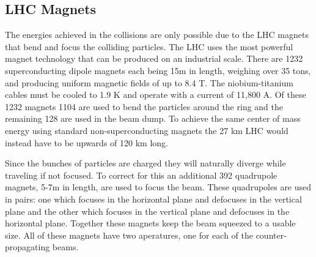 \subsection{LHC Magnets}
The energies achieved in the collisions are only possible due to the LHC magnets that bend and focus the colliding particles.  The LHC uses the most powerful magnet technology that can be produced on an industrial scale.  There are 1232 superconducting dipole magnets each being 15m in length, weighing over 35 tons, and producing uniform magnetic fields of up to 8.4 T.  The niobium-titanium cables must be cooled to 1.9 K and operate with a current of 11,800 A.  Of these 1232 magnets 1104 are used to bend the particles around the ring and the remaining 128 are used in the beam dump.  To achieve the same center of mass energy using standard non-superconducting magnets the 27 km LHC would instead have to be upwards of 120 km long.

Since the bunches of particles are charged they will naturally diverge while traveling if not focused.  To correct for this an additional 392 quadrupole magnets, 5-7m in length, are used to focus the beam.  These quadrupoles are used in pairs: one which focuses in the horizontal plane and defocuses in the vertical plane and the other which focuses in the vertical plane and defocuses in the horizontal plane.  Together these magnets keep the beam squeezed to a usable size.  All of these magnets have two aperatures, one for each of the counter-propagating beams.

